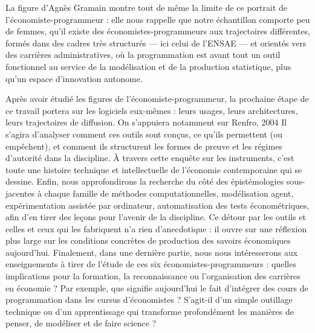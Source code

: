 La figure d’Agnès Gramain montre tout de même la limite de ce portrait de l’économiste-programmeur : elle nous rappelle que notre échantillon comporte peu de femmes, qu’il existe des économistes-programmeurs aux trajectoires différentes, formés dans des cadres très structurés — ici celui de l’ENSAE — et orientés vers des carrières administratives, où la programmation est avant tout un outil fonctionnel au service de la modélisation et de la production statistique, plus qu’un espace d’innovation autonome. 

Après avoir étudié les figures de l’économiste-programmeur, la prochaine étape de ce travail portera sur les logiciels eux-mêmes : leurs usages, leurs architectures, leurs trajectoires de diffusion. On s'appuiera notamment sur Renfro, 2004\cite{renfroCompendiumExistingEconometric2004} Il s’agira d’analyser comment ces outils sont conçus, ce qu’ils permettent (ou empêchent), et comment ils structurent les formes de preuve et les régimes d’autorité dans la discipline. À travers cette enquête sur les instruments, c’est toute une histoire technique et intellectuelle de l’économie contemporaine qui se dessine.
Enfin, nous approfondirons la recherche du côté des épistémologies sous-jacentes à chaque famille de méthodes computationnelles, modélisation agent, expérimentation assistée par ordinateur, automatisation des tests économétriques, afin d’en tirer des leçons pour l’avenir de la discipline. Ce détour par les outils et celles et ceux qui les fabriquent n’a rien d’anecdotique : il ouvre sur une réflexion plus large sur les conditions concrètes de production des savoirs économiques aujourd’hui.
Finalement, dans une dernière partie, nous nous intéresserons aux enseignements à tirer de l’étude de ces six économistes-programmeurs : quelles implications pour la formation, la reconnaissance ou l’organisation des carrières en économie ? Par exemple, que signifie aujourd’hui le fait d’intégrer des cours de programmation dans les cursus d’économistes ? S’agit-il d’un simple outillage technique ou d’un apprentissage qui transforme profondément les manières de penser, de modéliser et de faire science ?